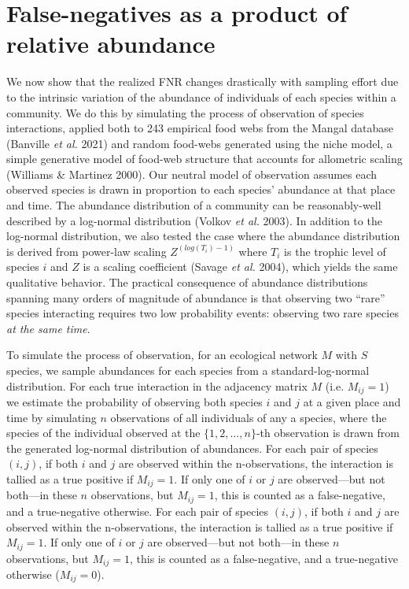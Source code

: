 \documentclass[10pt,oneside]{article}
\begin{document}
\hypertarget{false-negatives-as-a-product-of-relative-abundance}{%
\section{False-negatives as a product of relative
abundance}\label{false-negatives-as-a-product-of-relative-abundance}}

We now show that the realized FNR changes drastically with sampling
effort due to the intrinsic variation of the abundance of individuals of
each species within a community. We do this by simulating the process of
observation of species interactions, applied both to 243 empirical food
webs from the Mangal database (Banville \emph{et al.} 2021) and random
food-webs generated using the niche model, a simple generative model of
food-web structure that accounts for allometric scaling (Williams \&
Martinez 2000). Our neutral model of observation assumes each observed
species is drawn in proportion to each species' abundance at that place
and time. The abundance distribution of a community can be
reasonably-well described by a log-normal distribution (Volkov \emph{et
al.} 2003). In addition to the log-normal distribution, we also tested
the case where the abundance distribution is derived from power-law
scaling \(Z^{(log(T_i)-1)}\) where \(T_i\) is the trophic level of
species \(i\) and \(Z\) is a scaling coefficient (Savage \emph{et al.}
2004), which yields the same qualitative behavior. The practical
consequence of abundance distributions spanning many orders of magnitude
of abundance is that observing two ``rare'' species interacting requires
two low probability events: observing two rare species \emph{at the same
time}.

To simulate the process of observation, for an ecological network \(M\)
with \(S\) species, we sample abundances for each species from a
standard-log-normal distribution. For each true interaction in the
adjacency matrix \(M\) (i.e. \(M_{ij}=1\)) we estimate the probability
of observing both species \(i\) and \(j\) at a given place and time by
simulating \(n\) observations of all individuals of any a species, where
the species of the individual observed at the \(\{1,2,\dots,n\}\)-th
observation is drawn from the generated log-normal distribution of
abundances. For each pair of species \((i,j)\), if both \(i\) and \(j\)
are observed within the n-observations, the interaction is tallied as a
true positive if \(M_{ij}=1\). If only one of \(i\) or \(j\) are
observed---but not both---in these \(n\) observations, but \(M_{ij}=1\),
this is counted as a false-negative, and a true-negative otherwise. For
each pair of species \((i,j)\), if both \(i\) and \(j\) are observed
within the n-observations, the interaction is tallied as a true positive
if \(M_{ij}=1\). If only one of \(i\) or \(j\) are observed---but not
both---in these \(n\) observations, but \(M_{ij}=1\), this is counted as
a false-negative, and a true-negative otherwise (\(M_{ij} = 0\)).
\end{document}
